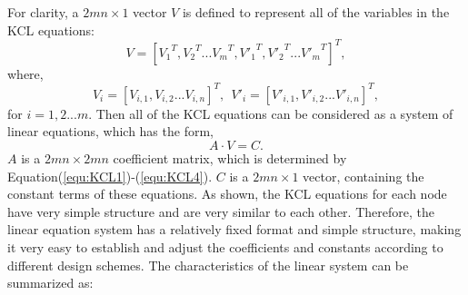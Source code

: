 For clarity, a ${2mn\times 1}$ vector ${V}$ is defined to represent all of the variables in the KCL equations:
\begin{equation}\label{equ:V1}
{V}=[{V_1}^T,{V_2}^T...{V_m}^T,{V'_1}^T,{V'_2}^T...{V'_m}^T]^T,
\end{equation}
where,
\begin{equation}\label{equ:V2}
{V_i} = [V_{i,1},V_{i,2}...V_{i,n}]^T,~~{V'_i} = [V'_{i,1},V'_{i,2}...V'_{i,n}]^T,
\end{equation}
for $i=1,2...m$. Then all of the KCL equations can be considered as a system of linear equations, which has the form,
\begin{equation}\label{equ:matrix}
A\cdot V = C.
\end{equation}
$A$ is a ${2mn\times{2mn}}$ coefficient matrix, which is determined by Equation(\ref{equ:KCL1})-(\ref{equ:KCL4}). $C$ is a ${2mn\times{1}}$ vector, containing the constant terms of these equations. As shown, the KCL equations for each node have very simple structure and are very similar to each other. Therefore, the linear equation system has a relatively fixed format and simple structure, making it very easy to establish and adjust the coefficients and constants according to different design schemes. The characteristics of the linear system can be summarized as:

